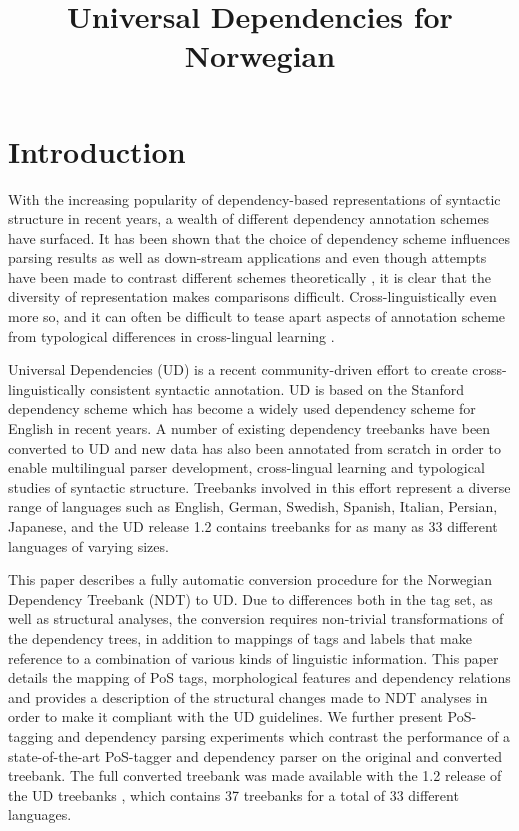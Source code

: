 \documentclass[10pt, a4paper]{article}
\title{Universal Dependencies for Norwegian}
\date{}
\begin{document}
\maketitleabstract

\section{Introduction}
With the increasing popularity of dependency-based representations of
syntactic structure in recent years, a wealth of different dependency
annotation schemes have surfaced. It has been shown that the choice of
dependency scheme influences parsing results \cite{Sch:Abe:Rap:12} as
well as down-stream applications \cite{Elm:Joh:Kle:13} and even though
attempts have been made to contrast different schemes theoretically
\cite{Iva:Oep:Ovr:12}, it is clear that the diversity of
representation makes comparisons difficult. Cross-linguistically even
more so, and it can often be difficult to tease apart
aspects of annotation scheme from typological differences in cross-lingual learning \cite{Soe:11,Skj:Ovr:12}.

Universal Dependencies (UD) \cite{Mar:Doz:Sil:14,Niv:15} is a recent
community-driven effort to create cross-linguistically consistent
syntactic annotation. UD is based on the Stanford dependency scheme
\cite{Mar:Mac:Man:06} which has become a widely used dependency scheme
for English in recent years.  A number of existing dependency
treebanks have been converted to UD \cite{Pyy:Kan:Miss:15,Niv:14}
and new data has also been annotated from scratch in order to enable
multilingual parser development, cross-lingual learning and
typological studies of syntactic structure. Treebanks involved in this
effort represent a diverse range of languages such as English, German,
Swedish, Spanish, Italian, Persian, Japanese, and the UD release 1.2
contains treebanks for as many as 33 different languages of varying
sizes.

This paper describes a fully automatic conversion procedure for the
Norwegian Dependency Treebank (NDT) to UD. Due to differences both in
the tag set, as well as structural analyses, the conversion requires
non-trivial transformations of the dependency trees, in addition to
mappings of tags and labels that make reference to a combination of
various kinds of linguistic information.  This paper details the
mapping of PoS tags, morphological features and dependency relations
and provides a description of the structural changes made to NDT
analyses in order to make it compliant with the UD guidelines. We
further present PoS-tagging and dependency parsing experiments which
contrast the performance of a state-of-the-art PoS-tagger and
dependency parser on the original and converted treebank. The full converted
treebank was made available with the 1.2 release of the UD treebanks
\cite{Niv:Mar:Gin:16}, which contains 37 treebanks for a total of 33 different languages.
\end{document}
